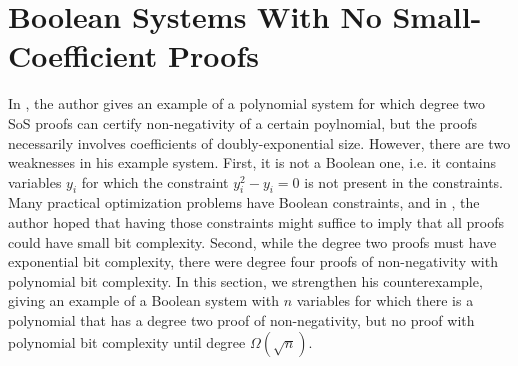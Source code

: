 
\section{Boolean Systems With No Small-Coefficient Proofs}\label{sec:counterexample}
In \cite{odonnell17}, the author gives an example of a polynomial system for which degree two SoS proofs can certify non-negativity of a certain poylnomial, but the proofs necessarily involves coefficients of doubly-exponential size. However, there are two weaknesses in his example system. First, it is not a Boolean one, i.e. it contains variables $y_i$ for which the constraint $y_i^2 - y_i = 0$ is not present in the constraints. Many practical optimization problems have Boolean constraints, and in \cite{odonnell17}, the author hoped that having those constraints might suffice to imply that all proofs could have small bit complexity. Second, while the degree two proofs must have exponential bit complexity, there were degree four proofs of non-negativity with polynomial bit complexity. 
%
%
In this section, we strengthen his counterexample, giving an example of a Boolean system with $n$ variables for which there is a polynomial that has a degree two proof of non-negativity, but no proof with polynomial bit complexity until degree $\Omega(\sqrt{n})$.

